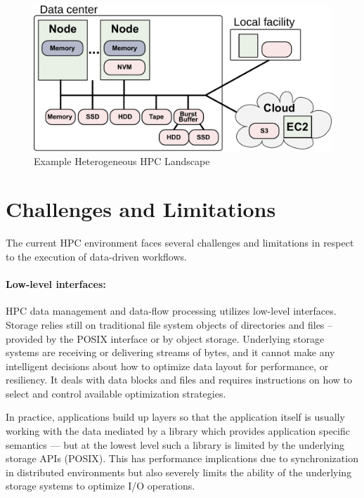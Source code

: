 \documentclass[a4paper, twocolumn]{article}
\begin{document}
\begin{figure}[b]
  \centering
  \includegraphics[width=\columnwidth]{system}
  \caption{Example Heterogeneous HPC Landscape}
  \label{fig:heterogeneous}
\end{figure}

\section{Challenges and Limitations}
\label{sec:challenges}
The current HPC environment faces several challenges and limitations in respect to the execution of data-driven workflows.



\paragraph{Low-level interfaces:}
HPC data management and data-flow processing utilizes low-level interfaces.
Storage relies still on traditional file system objects of directories and files -- provided by the POSIX interface or by object storage.
Underlying storage systems are receiving or delivering streams of bytes, and it cannot make any intelligent decisions about how to optimize data layout for performance, or resiliency.
It deals with data blocks and files and requires instructions on how to select and control available optimization strategies.

In practice, applications build up layers so that the application itself is usually working with the data mediated by a library which provides application specific semantics --- but at the lowest level such a library is limited by the underlying storage APIs (POSIX).
This has performance implications due to synchronization in distributed environments but also severely limits the ability of the underlying storage systems to optimize I/O operations.
\end{document}
